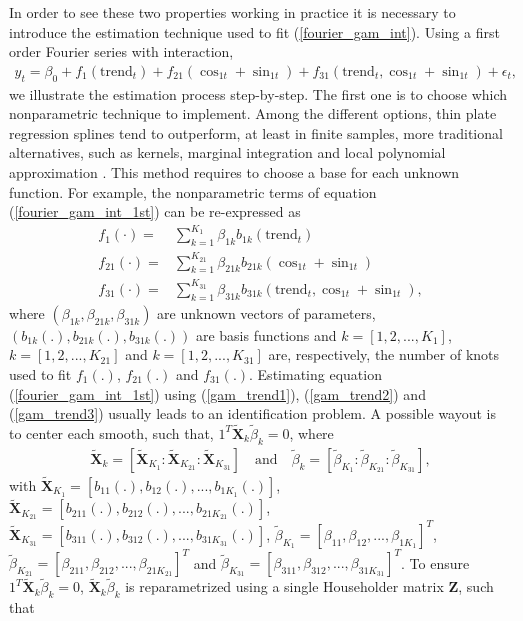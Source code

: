 \documentclass{article}\usepackage[]{graphicx}\usepackage[]{color}
\begin{document}
In order to see these two properties working in practice it is necessary to introduce the estimation technique used to fit (\ref{fourier_gam_int}). Using a first order Fourier series with interaction, 
\begin{align}\label{fourier_gam_int_1st}
y_{t}=\beta_{0}+f_{1}(\text{trend}_{t})+f_{21}(\cos_{1t}+\sin_{1t})+f_{31}(\text{trend}_{t}, \cos_{1t}+\sin_{1t})+\epsilon_{t},
\end{align}
we illustrate the estimation process step-by-step. The first one is to choose which nonparametric technique to implement. Among the different options, thin plate regression splines tend to outperform, at least in finite samples, more traditional alternatives, such as kernels, marginal integration and local polynomial approximation \cite{wood2003thin}. This method requires to choose a base for each unknown function. For example, the nonparametric terms of equation (\ref{fourier_gam_int_1st}) can be re-expressed as
\begin{align}
f_{1}(\cdot)  =& \sum_{k=1}^{K_{1}} \beta_{1k}b_{1k}(\text{trend}_{t}) \label{gam_trend1}  \\ 
f_{21}(\cdot) =& \sum_{k=1}^{K_{21}} \beta_{21k}b_{21k}(\cos_{1t}+\sin_{1t}) \label{gam_trend2}  \\ 
f_{31}(\cdot) =& \sum_{k=1}^{K_{31}} \beta_{31k}b_{31k}(\text{trend}_{t}, \cos_{1t}+\sin_{1t}), \label{gam_trend3}
\end{align}
where $ (\beta_{1k}, \beta_{21k}, \beta_{31k}) $ are unknown vectors of parameters, $ (b_{1k}(.), b_{21k}(.), b_{31k}(.))  $ are basis functions and $ k = [1, 2, ..., K_{1}] $, $ k = [1, 2, ..., K_{21}] $ and $ k = [1, 2, ..., K_{31}] $ are, respectively, the number of knots used to fit $ f_{1}(.) $, $ f_{21}(.)$ and $ f_{31}(.)$. Estimating equation (\ref{fourier_gam_int_1st}) using (\ref{gam_trend1}), (\ref{gam_trend2}) and (\ref{gam_trend3}) usually leads to an identification problem. A possible wayout is to center each smooth, such that, $ 1^{T}\mathbf{\tilde{X}}_{k}\tilde{\beta}_{k} = 0 $, where
\begin{align*}\label{}
\mathbf{\tilde{X}}_{k} = [\mathbf{\tilde{X}}_{K_{1}} : \mathbf{\tilde{X}}_{K_{21}} : \mathbf{\tilde{X}}_{K_{31}}] \quad \text{and} \quad \tilde{\beta}_{k} = [\tilde{\beta}_{K_{1}} : \tilde{\beta}_{K_{21}} : \tilde{\beta}_{K_{31}}],
\end{align*}
with $ \mathbf{\tilde{X}}_{K_{1}} = [b_{11}(.), b_{12}(.), ..., b_{1K_{1}}(.)] $, $ \mathbf{\tilde{X}}_{K_{21}} = [b_{211}(.), b_{212}(.), ..., b_{21K_{21}}(.)] $, \\ $ \mathbf{\tilde{X}}_{K_{31}} = [b_{311}(.), b_{312}(.), ..., b_{31K_{31}}(.)] $, $ \tilde{\beta}_{K_{1}} = [\beta_{11}, \beta_{12}, ..., \beta_{1K_{1}}]^{T} $, $ \tilde{\beta}_{K_{21}} = [\beta_{211}, \beta_{212}, ..., \beta_{21K_{21}}]^{T} $ and $ \tilde{\beta}_{K_{31}} = [\beta_{311}, \beta_{312}, ..., \beta_{31K_{31}}]^{T} $.  To ensure  $ 1^{T}\mathbf{\tilde{X}}_{k}\tilde{\beta}_{k} = 0 $,  $ \mathbf{\tilde{X}}_{k}\tilde{\beta}_{k} $ is reparametrized using a single Householder matrix $ \mathbf{Z} $, such that
\end{document}
